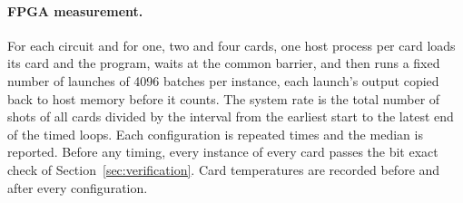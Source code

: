 \paragraph{FPGA measurement.} For each circuit and for one, two and four cards, one host process per card loads its
card and the program, waits at the common barrier, and then runs a fixed number of launches of 4096 batches per
instance, each launch's output copied back to host memory before it counts. The system rate is the total number of
shots of all cards divided by the interval from the earliest start to the latest end of the timed loops. Each
configuration is repeated \NumBenchReps{} times and the median is reported. Before any timing, every instance of every
card passes the bit exact check of Section~\ref{sec:verification}. Card temperatures are recorded before and after
every configuration.
